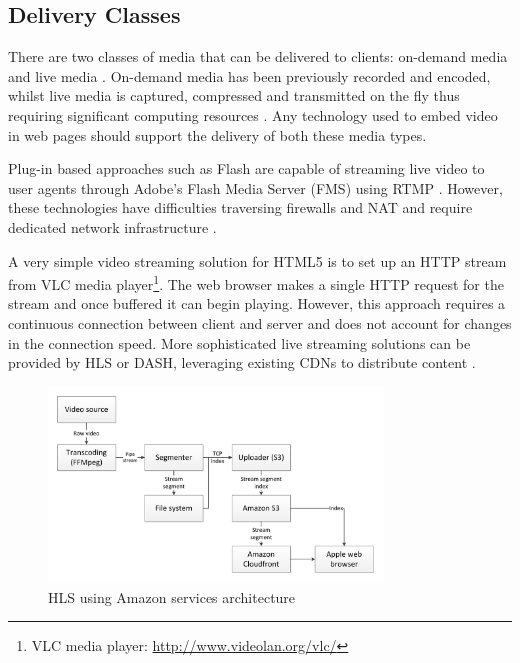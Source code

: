 \documentclass[journal]{IEEEtran}
\begin{document}
\subsection{Delivery Classes}
There are two classes of media that can be delivered to clients: on-demand media and live media \cite{techreport:aReviewOfHTTPLiveStreaming}. On-demand media has been previously recorded and encoded, whilst live media is captured, compressed and transmitted on the fly thus requiring significant computing resources \cite{techreport:aReviewOfHTTPLiveStreaming}. Any technology used to embed video in web pages should support the delivery of both these media types.

Plug-in based approaches such as Flash are capable of streaming live video to user agents through Adobe's Flash Media Server (FMS) using RTMP \cite{techreport:aReviewOfHTTPLiveStreaming}. However, these technologies have difficulties traversing firewalls and NAT and require dedicated network infrastructure \cite{inproceedings:dynamicAdapativeHTTPStreamingLive}. %

A very simple video streaming solution for HTML5 is to set up an HTTP stream from VLC media player\footnote{VLC media player: \url{http://www.videolan.org/vlc/}}. The web browser makes a single HTTP request for the stream and once buffered it can begin playing. However, this approach requires a continuous connection between client and server and does not account for changes in the connection speed. More sophisticated live streaming solutions can be provided by HLS or DASH, leveraging existing CDNs to distribute content \cite{techreport:aReviewOfHTTPLiveStreaming} \cite{inproceedings:dynamicAdapativeHTTPStreamingLive}. 

\begin{figure}[!t]
\centering
\includegraphics[width=3.5in]{streaming-diagram}
\caption{HLS using Amazon services architecture \cite{website:iPhoneHLSAmazon}}
\label{fig:hlsAmazonArch}
\end{figure} 
\end{document}
